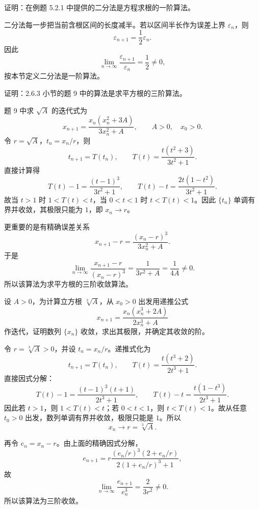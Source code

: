 \begin{xexercise}[3]
证明：在例题 5.2.1 中提供的二分法是方程求根的一阶算法。
\end{xexercise}
\begin{xsolution}
二分法每一步把当前含根区间的长度减半。若以区间半长作为误差上界 $\varepsilon_n$，则
\[
  \varepsilon_{n+1}=\frac12\varepsilon_n.
\]
因此
\[
  \lim_{n\to\infty}\frac{\varepsilon_{n+1}}{\varepsilon_n}=\frac12\ne0,
\]
按本节定义二分法是一阶算法。
\end{xsolution}


\begin{xexercise}[4]
证明：2.6.3 小节的题 9 中的算法是求平方根的三阶算法。
\end{xexercise}
\begin{xsolution}
题 9 中求 $\sqrt A$ 的迭代式为
\[
  x_{n+1}=\frac{x_n(x_n^2+3A)}{3x_n^2+A},
  \qquad A>0,\quad x_0>0.
\]
令 $r=\sqrt A$，$t_n=x_n/r$，则
\[
  t_{n+1}=T(t_n),
  \qquad
  T(t)=\frac{t(t^2+3)}{3t^2+1}.
\]
直接计算得
\[
  T(t)-1=\frac{(t-1)^3}{3t^2+1},
  \qquad
  T(t)-t=\frac{2t(1-t^2)}{3t^2+1}.
\]
故当 $t>1$ 时 $1<T(t)<t$，当 $0<t<1$ 时 $t<T(t)<1$。因此 $\{t_n\}$ 单调有界并收敛，其极限只能为 $1$，即 $x_n\to r$。

更重要的是有精确误差关系
\[
  x_{n+1}-r
  =\frac{(x_n-r)^3}{3x_n^2+A}.
\]
于是
\[
  \lim_{n\to\infty}
  \frac{x_{n+1}-r}{(x_n-r)^3}
  =\frac1{3r^2+A}
  =\frac1{4A}\ne0.
\]
所以该算法为求平方根的三阶收敛算法。
\end{xsolution}


\begin{xexercise}[5]
设 $A>0$，为计算立方根 $\sqrt[3]A$，从 $x_0>0$ 出发用递推公式
  \[
    x_{n+1}=\frac{x_n(x_n^3+2A)}{2x_n^3+A}
  \]
  作迭代，证明数列 $\{x_n\}$ 收敛，求出其极限，并确定其收敛的阶。
\end{xexercise}
\begin{xsolution}
令 $r=\sqrt[3]A>0$，并设 $t_n=x_n/r$。递推式化为
\[
  t_{n+1}=T(t_n),
  \qquad
  T(t)=\frac{t(t^3+2)}{2t^3+1}.
\]
直接因式分解：
\[
  T(t)-1=\frac{(t-1)^3(t+1)}{2t^3+1},
  \qquad
  T(t)-t=\frac{t(1-t^3)}{2t^3+1}.
\]
因此若 $t>1$，则 $1<T(t)<t$；若 $0<t<1$，则 $t<T(t)<1$。故从任意 $t_0>0$ 出发，数列单调有界并收敛，极限只能是 $1$。所以
\[
  \boxed{x_n\to r=\sqrt[3]A}.
\]

再令 $e_n=x_n-r$。由上面的精确因式分解，
\[
  e_{n+1}
  =r\frac{(e_n/r)^3(2+e_n/r)}{2(1+e_n/r)^3+1},
\]
故
\[
  \lim_{n\to\infty}\frac{e_{n+1}}{e_n^3}
  =\frac{2}{3r^2}\ne0.
\]
所以该算法为三阶收敛。
\end{xsolution}


